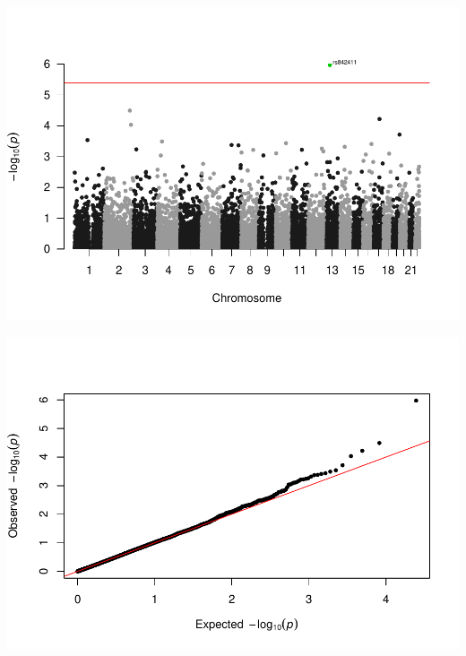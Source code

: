 \documentclass[
]{article}
\newenvironment{Shaded}{\begin{snugshade}}{\end{snugshade}}
\newcommand{\CommentTok}[1]{\textcolor[rgb]{0.56,0.35,0.01}{\textit{#1}}}
\newcommand{\DataTypeTok}[1]{\textcolor[rgb]{0.13,0.29,0.53}{#1}}
\newcommand{\FloatTok}[1]{\textcolor[rgb]{0.00,0.00,0.81}{#1}}
\newcommand{\KeywordTok}[1]{\textcolor[rgb]{0.13,0.29,0.53}{\textbf{#1}}}
\newcommand{\NormalTok}[1]{#1}
\newcommand{\OperatorTok}[1]{\textcolor[rgb]{0.81,0.36,0.00}{\textbf{#1}}}
\newcommand{\OtherTok}[1]{\textcolor[rgb]{0.56,0.35,0.01}{#1}}
\newcommand{\StringTok}[1]{\textcolor[rgb]{0.31,0.60,0.02}{#1}}
\begin{document}
\begin{Shaded}
\end{Shaded}

\includegraphics{stats-gene-research-progress-v7_files/figure-latex/OneCasualGene-1.pdf}

\begin{Shaded}
\end{Shaded}

\includegraphics{stats-gene-research-progress-v7_files/figure-latex/OneCasualGene-2.pdf}
\end{document}
